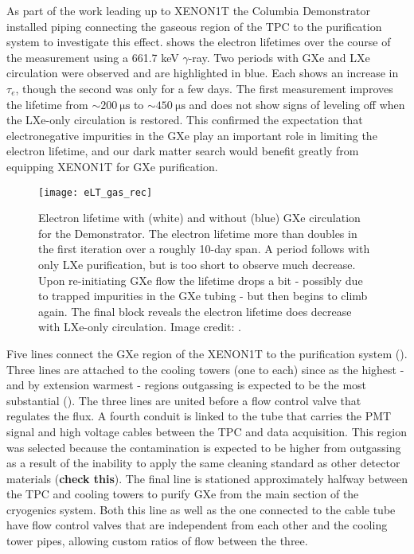 As part of the work leading up to XENON1T the Columbia Demonstrator installed piping connecting the gaseous region of the TPC to the
purification system to investigate this effect.   shows the electron lifetimes over
the course of the measurement using a  661.7 keV $\gamma$-ray.  Two periods with GXe and LXe circulation were observed and
are highlighted in blue.  Each shows an increase in
$\tau_e$, though the second was only for a few days.  The first measurement improves the lifetime from
${\sim} 200\ \mathrm{\mu s}$ to ${\sim} 450\ \mathrm{\mu s}$ and does not show signs of leveling off when the LXe-only circulation is
restored.  This confirmed the expectation that electronegative impurities in the GXe play an important role in limiting the electron
lifetime, and our dark matter search would benefit greatly from equipping XENON1T for GXe purification.

\begin{figure}
\centering
\texttt{[image: eLT\_gas\_rec]}
\caption{Electron lifetime with (white) and without (blue) GXe circulation for the Demonstrator.  The electron lifetime more than doubles
in the first iteration over a roughly 10-day span.  A period follows with
only LXe purification, but is too short to observe much decrease.  Upon re-initiating GXe flow the lifetime drops a bit - possibly due to
trapped impurities in the GXe tubing - but then begins to climb again.  The final block reveals the electron lifetime does
decrease with LXe-only circulation.  Image credit: .}
\label{fig:electron_lifetime_model_gxe_demonstrator}
\end{figure}

Five lines connect the GXe region of the XENON1T to the purification system ().  Three lines are attached to
the cooling towers (one to each) since as the highest - and by extension warmest - regions outgassing is expected to be the most
substantial ().  The three lines are united before a flow control valve
that regulates the flux.  A fourth conduit is linked to the tube that carries the PMT signal and high voltage cables between the TPC and
data acquisition.  This region was selected because the contamination is expected to be higher from outgassing as a result of the
inability to apply the same cleaning standard as other detector materials (\textbf{check this}).  The final line is stationed
approximately halfway between the TPC and cooling towers to purify GXe from the main section of the cryogenics system.  Both this line as
well
as the one connected to the cable tube have flow control valves that are independent from each other and the cooling tower pipes, allowing
custom ratios of flow between the three.

